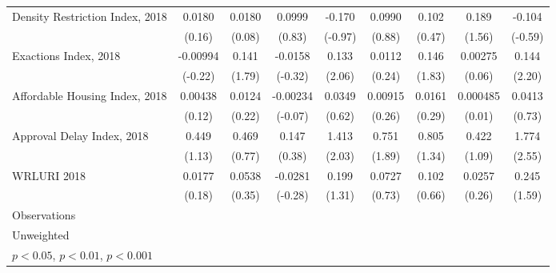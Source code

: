 \begin{table}[htbp]
\begin{tabular}{l*{8}{c}}
\addlinespace
Density Restriction Index, 2018&      0.0180         &      0.0180         &      0.0999         &      -0.170         &      0.0990         &       0.102         &       0.189         &      -0.104         \\
                    &      (0.16)         &      (0.08)         &      (0.83)         &     (-0.97)         &      (0.88)         &      (0.47)         &      (1.56)         &     (-0.59)         \\
\addlinespace
Exactions Index, 2018&    -0.00994         &       0.141         &     -0.0158         &       0.133\sym{*}  &      0.0112         &       0.146         &     0.00275         &       0.144\sym{*}  \\
                    &     (-0.22)         &      (1.79)         &     (-0.32)         &      (2.06)         &      (0.24)         &      (1.83)         &      (0.06)         &      (2.20)         \\
\addlinespace
Affordable Housing Index, 2018&     0.00438         &      0.0124         &    -0.00234         &      0.0349         &     0.00915         &      0.0161         &    0.000485         &      0.0413         \\
                    &      (0.12)         &      (0.22)         &     (-0.07)         &      (0.62)         &      (0.26)         &      (0.29)         &      (0.01)         &      (0.73)         \\
\addlinespace
Approval Delay Index, 2018&       0.449         &       0.469         &       0.147         &       1.413\sym{*}  &       0.751         &       0.805         &       0.422         &       1.774\sym{*}  \\
                    &      (1.13)         &      (0.77)         &      (0.38)         &      (2.03)         &      (1.89)         &      (1.34)         &      (1.09)         &      (2.55)         \\
\addlinespace
WRLURI 2018         &      0.0177         &      0.0538         &     -0.0281         &       0.199         &      0.0727         &       0.102         &      0.0257         &       0.245         \\
                    &      (0.18)         &      (0.35)         &     (-0.28)         &      (1.31)         &      (0.73)         &      (0.66)         &      (0.26)         &      (1.59)         \\
\midrule
Observations        &                     &                     &                     &                     &                     &                     &                     &                     \\
\bottomrule
\multicolumn{9}{l}{\footnotesize Unweighted}\\
\multicolumn{9}{l}{\footnotesize \sym{*} \(p<0.05\), \sym{**} \(p<0.01\), \sym{***} \(p<0.001\)}\\
\end{tabular}
\end{table}
